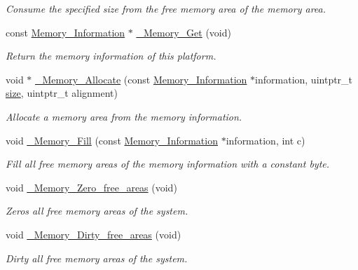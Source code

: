 \begin{DoxyCompactItemize}
\begin{DoxyCompactList}\small\item\em Consume the specified size from the free memory area of the memory area. \end{DoxyCompactList}\item 
const \mbox{\hyperlink{structMemory__Information}{Memory\+\_\+\+Information}} $\ast$ \mbox{\hyperlink{group__RTEMSScoreMemory_gaec9f82588542ae89940517c48f0208f6}{\+\_\+\+Memory\+\_\+\+Get}} (void)
\begin{DoxyCompactList}\small\item\em Return the memory information of this platform. \end{DoxyCompactList}\item 
void $\ast$ \mbox{\hyperlink{group__RTEMSScoreMemory_ga6ae667842e4629a82cf6b093f5bdfe40}{\+\_\+\+Memory\+\_\+\+Allocate}} (const \mbox{\hyperlink{structMemory__Information}{Memory\+\_\+\+Information}} $\ast$information, uintptr\+\_\+t \mbox{\hyperlink{sun4u_2tte_8h_a245260f6f74972558f61b85227df5aae}{size}}, uintptr\+\_\+t alignment)
\begin{DoxyCompactList}\small\item\em Allocate a memory area from the memory information. \end{DoxyCompactList}\item 
void \mbox{\hyperlink{group__RTEMSScoreMemory_gae6dced5f60807188ccb5a59ccd3aba55}{\+\_\+\+Memory\+\_\+\+Fill}} (const \mbox{\hyperlink{structMemory__Information}{Memory\+\_\+\+Information}} $\ast$information, int c)
\begin{DoxyCompactList}\small\item\em Fill all free memory areas of the memory information with a constant byte. \end{DoxyCompactList}\item 
\mbox{\label{group__RTEMSScoreMemory_gad72603fb49eb54511378c9a021d90c5f}} 
void \mbox{\hyperlink{group__RTEMSScoreMemory_gad72603fb49eb54511378c9a021d90c5f}{\+\_\+\+Memory\+\_\+\+Zero\+\_\+free\+\_\+areas}} (void)
\begin{DoxyCompactList}\small\item\em Zeros all free memory areas of the system. \end{DoxyCompactList}\item 
\mbox{\label{group__RTEMSScoreMemory_gab896c9b04fffb1fddf45c450692ab16f}} 
void \mbox{\hyperlink{group__RTEMSScoreMemory_gab896c9b04fffb1fddf45c450692ab16f}{\+\_\+\+Memory\+\_\+\+Dirty\+\_\+free\+\_\+areas}} (void)
\begin{DoxyCompactList}\small\item\em Dirty all free memory areas of the system. \end{DoxyCompactList}\end{DoxyCompactItemize}
